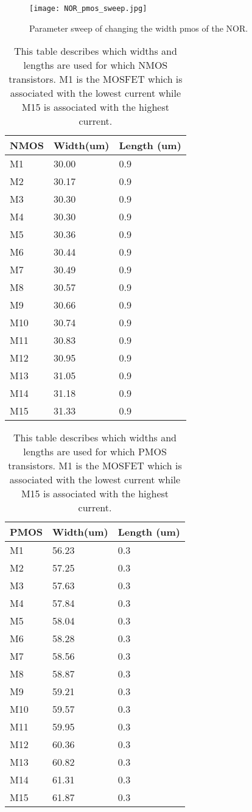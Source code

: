 \begin{figure}[h]
 \texttt{[image: NOR\_pmos\_sweep.jpg]}
 \caption{Parameter sweep of changing the width pmos of the NOR.}
 \label{fig:NOR_pmos_sweep_figure}
\end{figure}

\begin{table}[h!]
\caption{This table describes which widths and lengths are used for which NMOS transistors. M1 is the MOSFET which is associated with the lowest current while M15 is associated with the highest current.}
\begin{tabular}{l||l|l}\arraybackslash

NMOS & Width(um) & Length (um) \\\hline\hline
M1 & 30.00 & 0.9\\\hline
M2 & 30.17 & 0.9\\\hline
M3 & 30.30 & 0.9\\\hline
M4 &  30.30 & 0.9\\\hline
M5 & 30.36 & 0.9\\\hline
M6 & 30.44 & 0.9\\\hline
M7 & 30.49 & 0.9\\\hline
M8 & 30.57 & 0.9\\\hline
M9 & 30.66 & 0.9\\\hline
M10 & 30.74 & 0.9\\\hline
M11 & 30.83 & 0.9\\\hline
M12 & 30.95 & 0.9\\\hline
M13 & 31.05 & 0.9\\\hline
M14 & 31.18 & 0.9\\\hline
M15 & 31.33 & 0.9
\end{tabular}
\label{Tab:NMOS}
\end{table}
\begin{table}
\caption{This table describes which widths and lengths are used for which PMOS transistors. M1 is the MOSFET which is associated with the lowest current while M15 is associated with the highest current.} 
\begin{tabular}{l||l|l}
PMOS & Width(um) & Length (um) \\\hline\hline
M1 & 56.23 & 0.3\\\hline
M2 & 57.25 & 0.3\\\hline
M3 & 57.63 & 0.3\\\hline
M4 & 57.84& 0.3\\\hline
M5 & 58.04 & 0.3\\\hline
M6 & 58.28 & 0.3\\\hline
M7 & 58.56 & 0.3\\\hline
M8 & 58.87 & 0.3\\\hline
M9 & 59.21 & 0.3\\\hline
M10 & 59.57 & 0.3\\\hline
M11 & 59.95 & 0.3\\\hline
M12 & 60.36 & 0.3\\\hline
M13 & 60.82 & 0.3\\\hline
M14 & 61.31 & 0.3\\\hline
M15 & 61.87 & 0.3
\end{tabular}
\label{Tab:PMOS}
\end{table}


